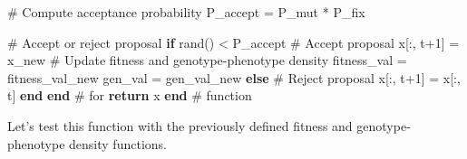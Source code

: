 \documentclass[
]{scrartcl}
\newenvironment{Shaded}{\begin{snugshade}}{\end{snugshade}}
\newcommand{\CommentTok}[1]{\textcolor[rgb]{0.37,0.37,0.37}{#1}}
\newcommand{\ControlFlowTok}[1]{\textcolor[rgb]{0.00,0.23,0.31}{\textbf{#1}}}
\newcommand{\FloatTok}[1]{\textcolor[rgb]{0.68,0.00,0.00}{#1}}
\newcommand{\FunctionTok}[1]{\textcolor[rgb]{0.28,0.35,0.67}{#1}}
\newcommand{\KeywordTok}[1]{\textcolor[rgb]{0.00,0.23,0.31}{\textbf{#1}}}
\newcommand{\NormalTok}[1]{\textcolor[rgb]{0.00,0.23,0.31}{#1}}
\newcommand{\OperatorTok}[1]{\textcolor[rgb]{0.37,0.37,0.37}{#1}}
\begin{document}
\begin{Shaded}
\begin{Highlighting}[]
        \CommentTok{\# Compute acceptance probability}
\NormalTok{        P\_accept }\OperatorTok{=}\NormalTok{ P\_mut }\OperatorTok{*}\NormalTok{ P\_fix}

        \CommentTok{\# Accept or reject proposal}
        \ControlFlowTok{if} \FunctionTok{rand}\NormalTok{() }\OperatorTok{\textless{}}\NormalTok{ P\_accept}
            \CommentTok{\# Accept proposal}
\NormalTok{            x[}\OperatorTok{:}\NormalTok{, t}\OperatorTok{+}\FloatTok{1}\NormalTok{] }\OperatorTok{=}\NormalTok{ x\_new}
            \CommentTok{\# Update fitness and genotype{-}phenotype density}
\NormalTok{            fitness\_val }\OperatorTok{=}\NormalTok{ fitness\_val\_new}
\NormalTok{            gen\_val }\OperatorTok{=}\NormalTok{ gen\_val\_new}
        \ControlFlowTok{else}
            \CommentTok{\# Reject proposal}
\NormalTok{            x[}\OperatorTok{:}\NormalTok{, t}\OperatorTok{+}\FloatTok{1}\NormalTok{] }\OperatorTok{=}\NormalTok{ x[}\OperatorTok{:}\NormalTok{, t]}
        \ControlFlowTok{end}
    \ControlFlowTok{end} \CommentTok{\# for}
    \ControlFlowTok{return}\NormalTok{ x}
\KeywordTok{end} \CommentTok{\# function}
\end{Highlighting}
\end{Shaded}

Let's test this function with the previously defined fitness and
genotype-phenotype density functions.
\end{document}
